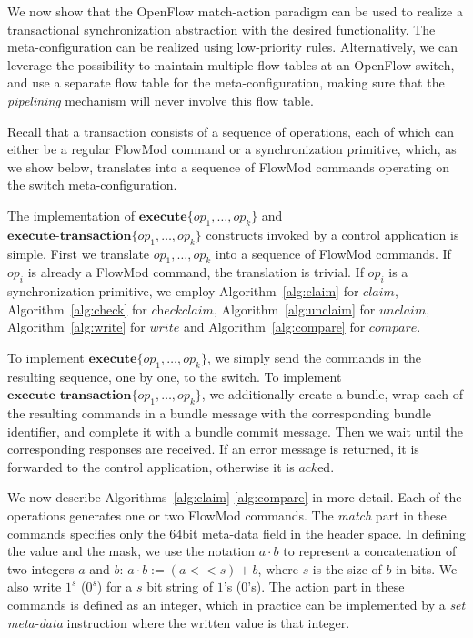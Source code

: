 \documentclass{sig-alternate-2006}
\newcommand{\concat}[0]{\cdot}
\newcommand{\liron}[1]{\textit{\textcolor{mypurple}{[liron]: #1}}} %
\newcommand{\exec}{\textbf{execute}}
\newcommand{\execatomic}{\textbf{execute-transaction}}
\newcommand{\ack}{\textit{ack}}
\newcommand{\ones}[1]{1^{#1}}
\newcommand{\zeros}[1]{0^{#1}}
\begin{document}
We now show that the OpenFlow match-action paradigm 
can be used  to realize a transactional synchronization abstraction
with the desired functionality. 
The 
meta-configuration can be realized using low-priority rules.
Alternatively, we can leverage the possibility to maintain multiple
flow tables at an OpenFlow switch, and use a separate flow table for
the meta-configuration,  making sure that the
\emph{pipelining} mechanism will never involve this
flow table.

Recall that a transaction consists of a sequence of operations,
each of which can either be a regular FlowMod command or a synchronization
primitive, which, as we
show below, translates into a sequence of FlowMod commands operating on the
switch meta-configuration.

The implementation of $\exec\{op_1,\ldots,op_k\}$ and
$\execatomic\{op_1,\ldots,op_k\}$ constructs
invoked by a control application is simple.
First we translate  $op_1,\ldots,op_k$ into a sequence of FlowMod
commands. If $op_i$ is already a FlowMod command, the translation is
trivial. If $op_i$ is a synchronization primitive, we employ
Algorithm~\ref{alg:claim} for $\textit{claim}$,
Algorithm~\ref{alg:check} for $\textit{checkclaim}$,
Algorithm~\ref{alg:unclaim}
for $\textit{unclaim}$,
Algorithm~\ref{alg:write} for $\textit{write}$ and
Algorithm~\ref{alg:compare} for $\textit{compare}$.

To implement  $\exec\{op_1,\ldots,op_k\}$, we simply send the commands in
the resulting sequence, one by one, to the switch.
%
To implement  $\execatomic\{op_1,\ldots,op_k\}$, we
additionally create a bundle, wrap each of the resulting commands in a
bundle message with the corresponding bundle identifier, and complete it
with a bundle commit message.
Then we wait until the
corresponding responses are received.
If an error message is returned,
it is forwarded to the control application,
otherwise it is $\ack$ed.

We now describe Algorithms~\ref{alg:claim}-\ref{alg:compare} in more
detail.
Each of the operations generates one or two FlowMod commands.
The \textit{match} part in these commands specifies only the $64$bit meta-data
field in the header space.
In defining the value and the mask,
we
use the notation $a\concat b$ to represent a concatenation of two
 integers $a$ and $b$: $a\concat b := (a<<s)+b$, where $s$ is the size of $b$ in bits.
We also write \texttt{$\ones{s}$} (\texttt{$\zeros{s}$}) for  a $s$ bit 
string of $1$'s ($0$'s).
%
The action part in these commands is defined as an integer, which in
practice can be implemented by a \emph{set meta-data} instruction where the written value is that integer.
\end{document}
